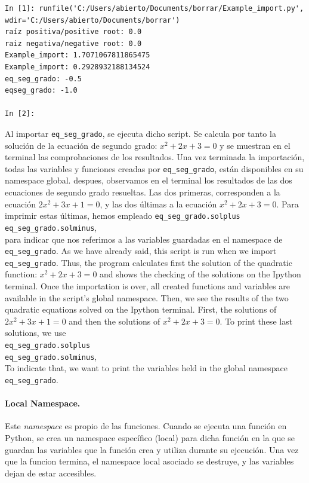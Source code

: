 \begin{verbatim}
In [1]: runfile('C:/Users/abierto/Documents/borrar/Example_import.py',
wdir='C:/Users/abierto/Documents/borrar')
raíz positiva/positive root: 0.0
raiz negativa/negative root: 0.0
Example_import: 1.7071067811865475
Example_import: 0.2928932188134524
eq_seg_grado: -0.5
eqseg_grado: -1.0

In [2]: 
\end{verbatim}
\begin{paracol}{2}
Al importar \texttt{eq_seg_grado}, se ejecuta dicho script. Se calcula por tanto la solución de la ecuación de segundo grado: $x^2+2x+3=0$ y se muestran en el terminal las comprobaciones de los resultados. Una vez terminada la importación, todas las variables y funciones creadas por \texttt{eq_seg_grado}, están disponibles en su namespace global. despues, observamos en el terminal los resultados de las dos ecuaciones de segundo grado resueltas. Las dos primeras, corresponden a la ecuación $2x^2+3x+1=0$, y las dos últimas a la ecuación $x^2+2x+3=0$. Para imprimir estas últimas, hemos empleado \texttt{eq_seg_grado.solplus}\\
\texttt{eq_seg_grado.solminus},\\ 
para indicar que nos referimos a las variables guardadas en el namespace de \texttt{eq_seg_grado}.
\switchcolumn
As we have already said, this script is run when we import \texttt{eq_seg_grado}. Thus, the program calculates first the solution of the quadratic function: $x^2+2x+3=0$ and shows the checking of the solutions on the Ipython terminal. Once the importation is over, all created functions and variables are available in the script's global namespace. Then, we see the results of the two quadratic equations solved on the Ipython terminal. First, the solutions of    $2x^2+3x+1=0$ and then the solutions of $x^2+2x+3=0$. To print these last solutions, we use\\
\texttt{eq_seg_grado.solplus}\\ 
\texttt{eq_seg_grado.solminus},\\
To indicate that, we want to print the variables held in the global namespace \texttt{eq_seg_grado}.  

\switchcolumn
\paragraph{Local Namespace.} Este \emph{namespace} es propio de las funciones. Cuando se ejecuta una función en Python, se crea un  namespace específico (local)  para dicha función en la que se guardan las variables que la función crea y utiliza durante su ejecución. Una vez que la funcion termina, el namespace local asociado se destruye, y las variables dejan de estar accesibles.


\end{paracol}
